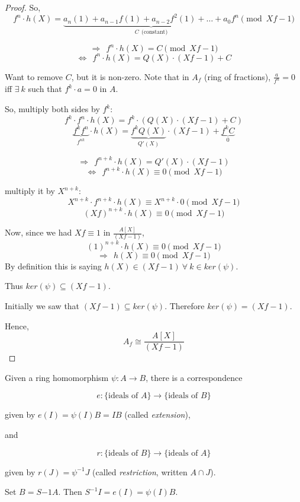 \documentclass{article}
\theoremstyle{definition}
\begin{document}
\begin{proof}
  So,
  $$f^n \cdot h(X)=\underbrace{a_n (1) + a_{n-1} f (1) + a_{n-2} f^2 (1) + \ldots + a_0 f^n}_{C~~\text{(constant)}} \pmod{Xf-1}$$

  $$\Longrightarrow~~ f^n \cdot h(X)=C \pmod{Xf-1}$$
  $$\Longleftrightarrow~~ f^n \cdot h(X)=Q(X) \cdot (Xf-1) + C$$

  Want to remove $C$, but it is non-zero. Note that in $A_f$ (ring of
  fractions), $\frac{a}{f^n} = 0$ iff $\exists~ k$ such that $f^k \cdot a = 0$ in $A$.

  So, multiply both sides by $f^k$:
  $$f^k \cdot f^n \cdot h(X)=f^k \cdot (Q(X) \cdot (Xf-1) + C)$$
  $$\underbrace{f^k f^n}_{f^{nk}} \cdot h(X)=\underbrace{f^k Q(X)}_{Q'(X)} \cdot (Xf-1) + \underbrace{f^k C}_{0}$$

  $$\Longrightarrow~~ f^{n+k} \cdot h(X)=Q'(X) \cdot (Xf-1)$$
  $$\Longleftrightarrow~~ f^{n+k} \cdot h(X) \equiv 0 \pmod{Xf-1}$$

  multiply it by $X^{n+k}$:
  $$X^{n+k} \cdot f^{n+k} \cdot h(X) \equiv X^{n+k} \cdot 0 \pmod{Xf-1}$$
  $$(Xf)^{n+k} \cdot h(X) \equiv 0 \pmod{Xf-1}$$

  Now, since we had $Xf \equiv 1$ in $\frac{A[X]}{(Xf-1)}$,
  $$(1)^{n+k} \cdot h(X) \equiv 0 \pmod{Xf-1}$$
  $$\Longrightarrow~~ h(X) \equiv 0 \pmod{Xf-1}$$
  By definition this is saying $h(X) \in (Xf-1) ~\forall~ k \in ker(\psi)$.

  Thus $ker(\psi) \subseteq (Xf-1)$.

  Initially we saw that $(Xf-1) \subseteq ker(\psi)$. Therefore $ker(\psi)=(Xf-1)$.

  Hence,
  $$A_f \cong \frac{A[X]}{(Xf-1)}$$
\end{proof}


\vspace{0.4cm}

Given a ring homomorphism $\psi: A \longrightarrow B$, there is a correspondence

$$e: \{ \text{ideals of } A \} \longrightarrow \{ \text{ideals of } B \}$$

given by $e(I) = \psi(I)B = IB$ (called \emph{extension}),

and

$$r: \{ \text{ideals of } B \} \longrightarrow \{ \text{ideals of } A \}$$

given by $r(J) = \psi^{-1} J$ (called \emph{restriction}, written $A \cap J$).

Set $B= S{-1}A$. Then $S^{-1}I = e(I) = \psi(I)B$.
\end{document}
